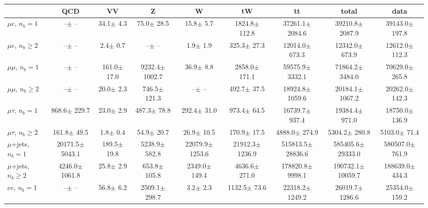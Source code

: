 \begin{sidewaystable}[p]
    \centering
    \setlength{\tabcolsep}{0.4em}
    \renewcommand{\arraystretch}{2}
    \small
    \begin{tabular}{l|cccccc|cc}
    \hline
        & QCD & VV  & Z & W & tW & tt & total & data      \\
    \hline
    
    $\mu e$, $n_b=1$                   &       --$\pm$     -- &     34.1$\pm$    4.3 &     75.0$\pm$   28.5 &     15.8$\pm$    5.7 &   1824.8$\pm$  112.8 &  37261.1$\pm$ 2084.6 &  39210.8$\pm$ 2087.9 &  39143.0$\pm$  197.8 \\ 
    $\mu e$, $n_b\geq2$                &       --$\pm$     -- &      2.4$\pm$    0.7 &       --$\pm$     -- &      1.9$\pm$    1.9 &    325.3$\pm$   27.3 &  12014.0$\pm$  673.3 &  12342.0$\pm$  673.9 &  12612.0$\pm$  112.3 \\ 
    \hline
    $\mu\mu$, $n_b=1$                  &       --$\pm$     -- &    161.0$\pm$   17.0 &   9232.4$\pm$ 1002.7 &     36.9$\pm$    8.8 &   2858.0$\pm$  171.1 &  59575.9$\pm$ 3332.1 &  71864.2$\pm$ 3484.0 &  70629.0$\pm$  265.8 \\ 
    $\mu\mu$, $n_b\geq2$               &       --$\pm$     -- &     20.0$\pm$    2.3 &    746.5$\pm$  121.3 &       --$\pm$     -- &    492.7$\pm$   37.5 &  18924.8$\pm$ 1059.6 &  20184.1$\pm$ 1067.2 &  20262.0$\pm$  142.3 \\ 
    \hline
    $\mu\tau$, $n_b=1$                 &    868.6$\pm$  229.7 &     23.0$\pm$    2.9 &    487.3$\pm$   78.8 &    292.4$\pm$   31.0 &    973.4$\pm$   64.5 &  16739.7$\pm$  937.4 &  19384.4$\pm$  971.0 &  18750.0$\pm$  136.9 \\ 
    $\mu\tau$, $n_b\geq2$              &    161.8$\pm$   49.5 &      1.8$\pm$    0.4 &     54.9$\pm$   20.7 &     26.9$\pm$   10.5 &    170.9$\pm$   17.5 &   4888.0$\pm$  274.9 &   5304.2$\pm$  280.8 &   5103.0$\pm$   71.4 \\ 
    \hline
    $\mu$+jets, $n_b=1$                &  20171.5$\pm$ 5043.1 &    189.5$\pm$   19.8 &   5238.9$\pm$  582.8 &  22079.9$\pm$ 1253.6 &  21912.3$\pm$ 1236.9 & 515813.5$\pm$28836.6 & 585405.6$\pm$29333.0 & 580507.0$\pm$  761.9 \\ 
    $\mu$+jets, $n_b\geq2$             &   4246.0$\pm$ 1061.8 &     25.8$\pm$    2.9 &    653.8$\pm$  105.8 &   2349.0$\pm$  149.4 &   4636.6$\pm$  271.0 & 178820.8$\pm$ 9998.1 & 190732.1$\pm$10059.7 & 188639.0$\pm$  434.3 \\ 
    \hline
    $e e$, $n_b=1$                     &       --$\pm$     -- &     56.8$\pm$    6.2 &   2509.1$\pm$  298.7 &      3.2$\pm$    2.3 &   1132.5$\pm$   73.6 &  22318.2$\pm$ 1249.2 &  26019.7$\pm$ 1286.6 &  25354.0$\pm$  159.2 \\ 

\end{tabular}
\end{sidewaystable}
